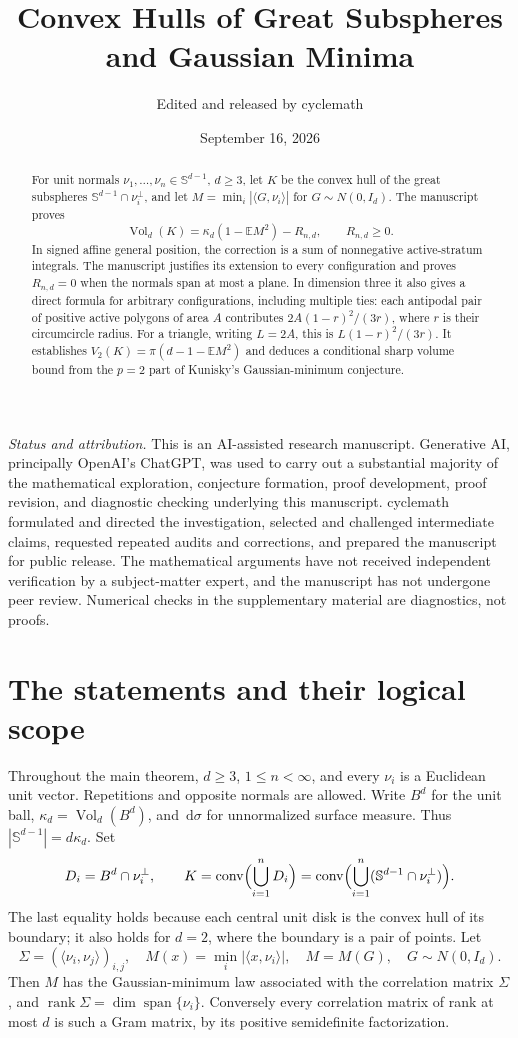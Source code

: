 \documentclass[10pt,reqno]{amsart}
\title[Great Subspheres and Gaussian Minima]{Convex Hulls of Great Subspheres and Gaussian Minima}
\author{Edited and released by \MakeLowercase{cyclemath}}
\date{September 16, 2026}
\theoremstyle{definition}
\theoremstyle{remark}
\newcommand{\E}{\mathbb E}
\newcommand{\Sphere}{\mathbb S}
\newcommand{\conv}{\operatorname{conv}}
\newcommand{\Vol}{\operatorname{Vol}}
\newcommand{\rank}{\operatorname{rank}}
\newcommand{\Span}{\operatorname{span}}
\newcommand{\dd}{\,\mathrm d}
\newcommand{\ip}[2]{\langle #1,#2\rangle}
\begin{document}
\begin{abstract}
For unit normals $\nu_1,\ldots,\nu_n\in\Sphere^{d-1}$, $d\ge3$, let $K$ be the convex hull of the great subspheres $\Sphere^{d-1}\cap\nu_i^\perp$, and let $M=\min_i|\ip{G}{\nu_i}|$ for $G\sim N(0,I_d)$. The manuscript proves
\[
\Vol_d(K)=\kappa_d(1-\E M^2)-R_{n,d},\qquad R_{n,d}\ge0.
\]
In signed affine general position, the correction is a sum of nonnegative active-stratum integrals. The manuscript justifies its extension to every configuration and proves $R_{n,d}=0$ when the normals span at most a plane. In dimension three it also gives a direct formula for arbitrary configurations, including multiple ties: each antipodal pair of positive active polygons of area $A$ contributes $2A(1-r)^2/(3r)$, where $r$ is their circumcircle radius. For a triangle, writing $L=2A$, this is $L(1-r)^2/(3r)$. It establishes $V_2(K)=\pi(d-1-\E M^2)$ and deduces a conditional sharp volume bound from the $p=2$ part of Kunisky's Gaussian-minimum conjecture.
\end{abstract}
\maketitle
\noindent\textit{Status and attribution.} This is an AI-assisted research manuscript. Generative AI, principally OpenAI's ChatGPT, was used to carry out a substantial majority of the mathematical exploration, conjecture formation, proof development, proof revision, and diagnostic checking underlying this manuscript. cyclemath formulated and directed the investigation, selected and challenged intermediate claims, requested repeated audits and corrections, and prepared the manuscript for public release. The mathematical arguments have not received independent verification by a subject-matter expert, and the manuscript has not undergone peer review. Numerical checks in the supplementary material are diagnostics, not proofs.

\section{The statements and their logical scope}\label{sec:introduction}
Throughout the main theorem, $d\ge3$, $1\le n<\infty$, and every $\nu_i$ is a Euclidean unit vector. Repetitions and opposite normals are allowed. Write $B^d$ for the unit ball, $\kappa_d=\Vol_d(B^d)$, and $\dd\sigma$ for unnormalized surface measure. Thus $|\Sphere^{d-1}|=d\kappa_d$. Set
\begin{equation}\label{eq:disks}
D_i=B^d\cap\nu_i^\perp,\qquad
K=\conv\Bigl(\bigcup_{i=1}^nD_i\Bigr)
=\conv\Bigl(\bigcup_{i=1}^n(\Sphere^{d-1}\cap\nu_i^\perp)\Bigr).
\end{equation}
The last equality holds because each central unit disk is the convex hull of its boundary; it also holds for $d=2$, where the boundary is a pair of points. Let
\[
\Sigma=(\ip{\nu_i}{\nu_j})_{i,j},\quad
M(x)=\min_i|\ip{x}{\nu_i}|,\quad M=M(G),\quad G\sim N(0,I_d).
\]
Then $M$ has the Gaussian-minimum law associated with the correlation matrix $\Sigma$, and $\rank\Sigma=\dim\Span\{\nu_i\}$. Conversely every correlation matrix of rank at most $d$ is such a Gram matrix, by its positive semidefinite factorization.
\end{document}
